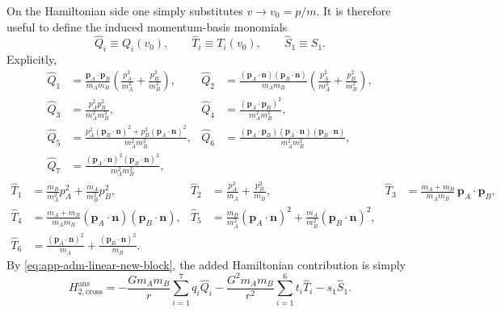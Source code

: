 \documentclass[11pt]{article}
\newcommand{\pvec}{\mathbf p}
\newcommand{\nvec}{\mathbf n}
\begin{document}
On the Hamiltonian side one simply substitutes \(v\to v_0=p/m\).  It is therefore
useful to define the induced momentum-basis monomials
\begin{equation}
\widehat Q_i\equiv Q_i(v_0),
\qquad
\widehat T_i\equiv T_i(v_0),
\qquad
\widehat S_1\equiv S_1.
\label{eq:app-adm-hatted-basis-def}
\end{equation}
Explicitly,
\begin{align}
\widehat Q_1
&=
\frac{\pvec_A\!\cdot\!\pvec_B}{m_A m_B}
\left(\frac{p_A^2}{m_A^2}+\frac{p_B^2}{m_B^2}\right),
&
\widehat Q_2
&=
\frac{(\pvec_A\!\cdot\!\nvec)(\pvec_B\!\cdot\!\nvec)}{m_A m_B}
\left(\frac{p_A^2}{m_A^2}+\frac{p_B^2}{m_B^2}\right),
\nonumber\\
\widehat Q_3
&=
\frac{p_A^2p_B^2}{m_A^2m_B^2},
&
\widehat Q_4
&=
\frac{(\pvec_A\!\cdot\!\pvec_B)^2}{m_A^2m_B^2},
\nonumber\\
\widehat Q_5
&=
\frac{p_A^2(\pvec_B\!\cdot\!\nvec)^2+p_B^2(\pvec_A\!\cdot\!\nvec)^2}{m_A^2m_B^2},
&
\widehat Q_6
&=
\frac{(\pvec_A\!\cdot\!\pvec_B)(\pvec_A\!\cdot\!\nvec)(\pvec_B\!\cdot\!\nvec)}{m_A^2m_B^2},
\nonumber\\
\widehat Q_7
&=
\frac{(\pvec_A\!\cdot\!\nvec)^2(\pvec_B\!\cdot\!\nvec)^2}{m_A^2m_B^2},
\label{eq:app-adm-hatted-Qs}
\end{align}
\begin{align}
\widehat T_1
&=
\frac{m_B}{m_A^2}p_A^2+\frac{m_A}{m_B^2}p_B^2,
&
\widehat T_2
&=
\frac{p_A^2}{m_A}+\frac{p_B^2}{m_B},
&
\widehat T_3
&=
\frac{m_A+m_B}{m_A m_B}\,\pvec_A\!\cdot\!\pvec_B,
\nonumber\\
\widehat T_4
&=
\frac{m_A+m_B}{m_A m_B}
(\pvec_A\!\cdot\!\nvec)(\pvec_B\!\cdot\!\nvec),
&
\widehat T_5
&=
\frac{m_B}{m_A^2}(\pvec_A\!\cdot\!\nvec)^2
+\frac{m_A}{m_B^2}(\pvec_B\!\cdot\!\nvec)^2,
\nonumber\\
\widehat T_6
&=
\frac{(\pvec_A\!\cdot\!\nvec)^2}{m_A}
+\frac{(\pvec_B\!\cdot\!\nvec)^2}{m_B}.
\label{eq:app-adm-hatted-Ts}
\end{align}
By \cref{eq:app-adm-linear-new-block}, the added Hamiltonian contribution is simply
\begin{equation}
H_{2,\mathrm{cross}}^{\mathrm{ans}}
=-\frac{Gm_A m_B}{r}\sum_{i=1}^{7}q_i\widehat Q_i
-\frac{G^2m_A m_B}{r^2}\sum_{i=1}^{6}t_i\widehat T_i
-s_1\widehat S_1.
\label{eq:app-adm-Hcross-ans}
\end{equation}
\end{document}
